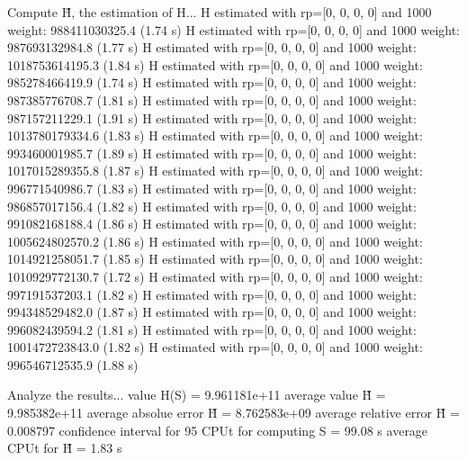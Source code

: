 Compute H̃, the estimation of H...
  H estimated with rp=[0, 0, 0, 0] and 1000 weight:  988411030325.4  (1.74 s)
  H estimated with rp=[0, 0, 0, 0] and 1000 weight:  987693132984.8  (1.77 s)
  H estimated with rp=[0, 0, 0, 0] and 1000 weight:  1018753614195.3  (1.84 s)
  H estimated with rp=[0, 0, 0, 0] and 1000 weight:  985278466419.9  (1.74 s)
  H estimated with rp=[0, 0, 0, 0] and 1000 weight:  987385776708.7  (1.81 s)
  H estimated with rp=[0, 0, 0, 0] and 1000 weight:  987157211229.1  (1.91 s)
  H estimated with rp=[0, 0, 0, 0] and 1000 weight:  1013780179334.6  (1.83 s)
  H estimated with rp=[0, 0, 0, 0] and 1000 weight:  993460001985.7  (1.89 s)
  H estimated with rp=[0, 0, 0, 0] and 1000 weight:  1017015289355.8  (1.87 s)
  H estimated with rp=[0, 0, 0, 0] and 1000 weight:  996771540986.7  (1.83 s)
  H estimated with rp=[0, 0, 0, 0] and 1000 weight:  986857017156.4  (1.82 s)
  H estimated with rp=[0, 0, 0, 0] and 1000 weight:  991082168188.4  (1.86 s)
  H estimated with rp=[0, 0, 0, 0] and 1000 weight:  1005624802570.2  (1.86 s)
  H estimated with rp=[0, 0, 0, 0] and 1000 weight:  1014921258051.7  (1.85 s)
  H estimated with rp=[0, 0, 0, 0] and 1000 weight:  1010929772130.7  (1.72 s)
  H estimated with rp=[0, 0, 0, 0] and 1000 weight:  997191537203.1  (1.82 s)
  H estimated with rp=[0, 0, 0, 0] and 1000 weight:  994348529482.0  (1.87 s)
  H estimated with rp=[0, 0, 0, 0] and 1000 weight:  996082439594.2  (1.81 s)
  H estimated with rp=[0, 0, 0, 0] and 1000 weight:  1001472723843.0  (1.82 s)
  H estimated with rp=[0, 0, 0, 0] and 1000 weight:  996546712535.9  (1.88 s)

Analyze the results...
  value H(S)                  = 9.961181e+11 
  average value H̃             = 9.985382e+11 
  average absolue error H̃     = 8.762583e+09 
  average relative error H̃    = 0.008797 
  confidence interval for 95%
  CPUt for computing S         = 99.08 s
  average CPUt for H̃           = 1.83 s

